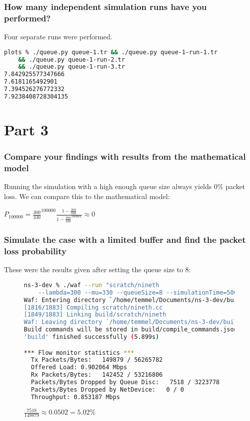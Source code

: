 \documentclass[a4paper, titlepage,12pt]{article}
\begin{document}
			\subsubsection*{How many independent simulation runs have you performed?}
				Four separate runs were performed.
				\begin{lstlisting}[language=sh]
plots % ./queue.py queue-1.tr && ./queue.py queue-1-run-1.tr 
	&& ./queue.py queue-1-run-2.tr 
	&& ./queue.py queue-1-run-3.tr
7.842925577347666
7.6181165492901
7.394526276772332
7.9238408728304135
				\end{lstlisting}

		\section*{Part 3}

			\subsubsection*{Compare your findings with results from the mathematical model}

			Running the simulation with a high enough queue size always yields $0\%$ packet loss. We can compare this to the mathematical model:

				\begin{center}
					$P_{100000}=\frac{300}{330}^{100000}\frac{1-\frac{300}{330}}{1-\frac{300}{330}^{100001}} \approx 0$
				\end{center}

			\subsubsection*{Simulate the case with a limited buffer and find the packet loss probability}

				These were the results given after setting the queue size to $8$:

				\begin{figure}[h!]
					\begin{lstlisting}[language=sh]
ns-3-dev % ./waf --run "scratch/nineth 
	--lambda=300 --mu=330 --queueSize=8 --simulationTime=500"
Waf: Entering directory `/home/temmel/Documents/ns-3-dev/build'
[1816/1883] Compiling scratch/nineth.cc
[1849/1883] Linking build/scratch/nineth
Waf: Leaving directory `/home/temmel/Documents/ns-3-dev/build'
Build commands will be stored in build/compile_commands.json
'build' finished successfully (5.899s)

*** Flow monitor statistics ***
  Tx Packets/Bytes:   149879 / 56265782
  Offered Load: 0.902064 Mbps
  Rx Packets/Bytes:   142452 / 53216806
  Packets/Bytes Dropped by Queue Disc:   7518 / 3223778
  Packets/Bytes Dropped by NetDevice:   0 / 0
  Throughput: 0.853187 Mbps
					\end{lstlisting}

					\begin{center}
						$\frac{7518}{149879} \approx 0.0502 = 5.02\%$
					\end{center}

				\end{figure}
\end{document}
